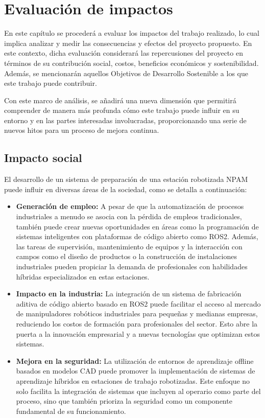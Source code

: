 \chapter{ Evaluación de impactos}
\label{cap:evaluacion_impactos}

En este capítulo se procederá a evaluar los impactos del trabajo realizado, lo cual implica analizar y medir las consecuencias y efectos del proyecto propuesto. En este contexto, dicha evaluación considerará las repercusiones del proyecto en términos de su contribución social, costos, beneficios económicos y sostenibilidad. Además, se mencionarán aquellos Objetivos de Desarrollo Sostenible a los que este trabajo puede contribuir.

Con este marco de análisis, se añadirá una nueva dimensión que permitirá comprender de manera más profunda cómo este trabajo puede influir en su entorno y en las partes interesadas involucradas, proporcionando una serie de nuevos hitos para un proceso de mejora continua.

\section{Impacto social}

El desarrollo de un sistema de preparación de una estación robotizada \acrshort{NPAM} puede influir en diversas áreas de la sociedad, como se detalla a continuación:

\begin{itemize}
    \item \textbf{Generación de empleo:} A pesar de que la automatización de procesos industriales a menudo se asocia con la pérdida de empleos tradicionales, también puede crear nuevas oportunidades en áreas como la programación de sistemas inteligentes con plataformas de código abierto como ROS2. Además, las tareas de supervisión, mantenimiento de equipos y la interacción con campos como el diseño de productos o la construcción de instalaciones industriales pueden propiciar la demanda de profesionales con habilidades híbridas especializados en estas estaciones.
    
    \item \textbf{Impacto en la industria:} La integración de un sistema de fabricación aditiva de código abierto basado en ROS2 puede facilitar el acceso al mercado de manipuladores robóticos industriales para pequeñas y medianas empresas, reduciendo los costos de formación para profesionales del sector. Esto abre la puerta a la innovación empresarial y a nuevas tecnologías que optimizan estos sistemas.
    
    \item \textbf{Mejora en la seguridad:} La utilización de entornos de aprendizaje offline basados en modelos \acrshort{CAD} puede promover la implementación de sistemas de aprendizaje híbridos en estaciones de trabajo robotizadas. Este enfoque no solo facilita la integración de sistemas que incluyen al operario como parte del proceso, sino que también prioriza la seguridad como un componente fundamental de su funcionamiento.
\end{itemize}

